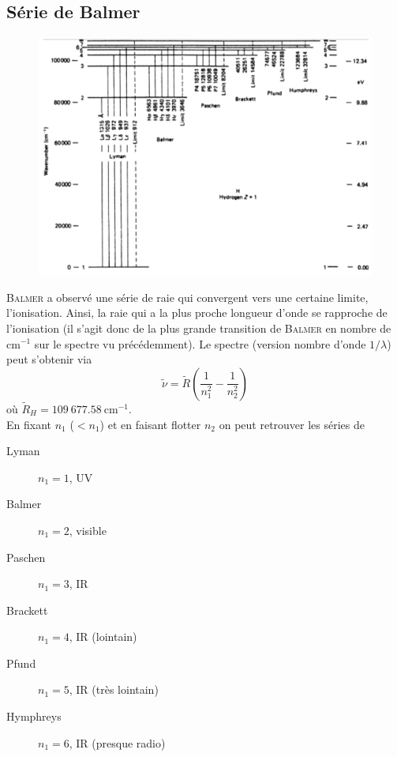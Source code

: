 \subsection{Série de Balmer}
	\begin{figure}
	\vspace{-5mm}
	\includegraphics[scale=0.4]{ch1/image4}
	\end{figure}
\textsc{Balmer} a observé une série de raie qui convergent vers une certaine limite, l'ionisation. Ainsi, la
raie qui a la plus proche longueur d'onde se rapproche de l'ionisation (il s'agit donc de la plus grande 
transition de \textsc{Balmer} en nombre de cm$^{-1}$ sur le spectre vu précédemment). Le spectre (version 
nombre d'onde $1/\lambda$) peut s'obtenir via
\begin{equation}
\tilde{\nu} = \tilde{R}\left(\frac{1}{n_1^2}-\frac{1}{n_2^2}\right)
\end{equation}
où $\tilde{R}_H = 109\ 677.58\ \text{cm}^{-1}$.\\

En fixant $n_1$ ($< n_1$) et en faisant flotter $n_2$ on peut retrouver les séries de
\begin{multicols}{2}
\begin{description}
\item[Lyman] $n_1=1$, UV
\item[Balmer] $n_1=2$, visible
\item[Paschen] $n_1=3$, IR
\item[Brackett] $n_1=4$, IR (lointain)
\item[Pfund] $n_1=5$, IR (très lointain)
\item[Hymphreys] $n_1=6$, IR (presque radio)
\end{description}
\end{multicols}


